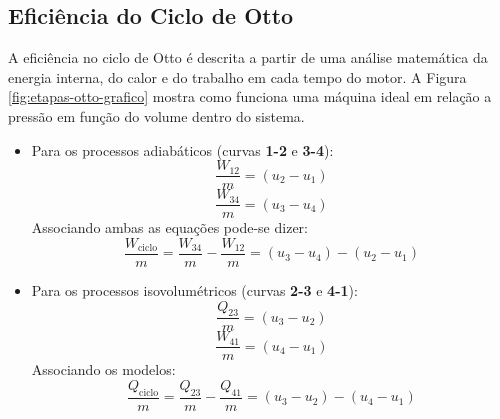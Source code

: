 \documentclass[10pt, conference, letterpaper]{IEEEtran}
\begin{document}
\subsection{Eficiência do Ciclo de Otto}

\hspace{0.5cm}A eficiência no ciclo de Otto é descrita a partir de uma análise matemática da energia interna, do calor e do trabalho em cada tempo do motor. A Figura \ref{fig:etapas-otto-grafico} mostra como funciona uma máquina ideal em relação a pressão em função do volume dentro do sistema.

\begin{itemize}
    \item Para os processos adiabáticos (curvas \textbf{1-2} e \textbf{3-4}):
    \begin{equation}\label{1}
    \frac{W_{\text{12}}}{m}=(u_{\text{2}}-u_{\text{1}})
    \end{equation}
    \begin{equation}\label{2}
    \frac{W_{\text{34}}}{m}=(u_{\text{3}}-u_{\text{4}})
    \end{equation}
    Associando ambas as equações pode-se dizer:
    \begin{equation}\label{3}
    \frac{W_{\text{ciclo}}}{m}=\frac{W_{\text{34}}}{m}-\frac{W_{\text{12}}}{m}=(u_{\text{3}}-u_{\text{4}})-(u_{\text{2}}-u_{\text{1}})
    \end{equation}

    \item Para os processos isovolumétricos (curvas \textbf{2-3} e \textbf{4-1}):
    \begin{equation}\label{4}
    \frac{Q_{\text{23}}}{m}=(u_{\text{3}}-u_{\text{2}})
    \end{equation}
    \begin{equation}\label{5}
    \frac{W_{\text{41}}}{m}=(u_{\text{4}}-u_{\text{1}})
    \end{equation}
    Associando os modelos:
    \begin{equation}\label{6}
    \frac{Q_{\text{ciclo}}}{m}=\frac{Q_{\text{23}}}{m}-\frac{Q_{\text{41}}}{m}=(u_{\text{3}}-u_{\text{2}})-(u_{\text{4}}-u_{\text{1}})
    \end{equation}
\end{itemize}
\end{document}
